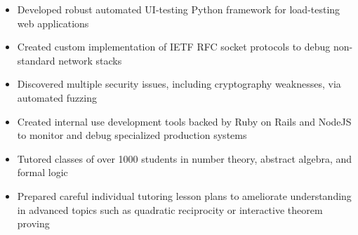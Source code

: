 \documentclass[10pt,a4paper]{altacv}
\newenvironment{tightitemize} %
{\vspace{-\topsep}\begin{itemize}\itemsep1pt \parskip0pt \parsep0pt}
{\end{itemize}\vspace{-\topsep}}
\begin{document}
\smallskip
\divider
\smallskip

\vspace{\topsep} %
\begin{tightitemize}
    \item Developed robust automated UI-testing Python framework for 
        load-testing web applications
    \item Created custom implementation of IETF RFC socket protocols to debug 
        non-standard network stacks
    \item Discovered multiple security issues, including cryptography 
        weaknesses, via automated fuzzing
\end{tightitemize}

\smallskip
\divider
\smallskip

\vspace{\topsep} %
\begin{tightitemize}
\item Created internal use development tools backed by Ruby on Rails 
    and NodeJS to monitor and debug specialized production 
    systems
\end{tightitemize}

\smallskip
\divider
\smallskip

\vspace{\topsep} %
\begin{tightitemize}
\item Tutored classes of over 1000 students in number theory, abstract algebra, 
    and formal logic
\item Prepared careful individual tutoring lesson plans to ameliorate 
    understanding in advanced topics such as quadratic reciprocity or 
    interactive theorem proving
\end{tightitemize}
\end{document}
